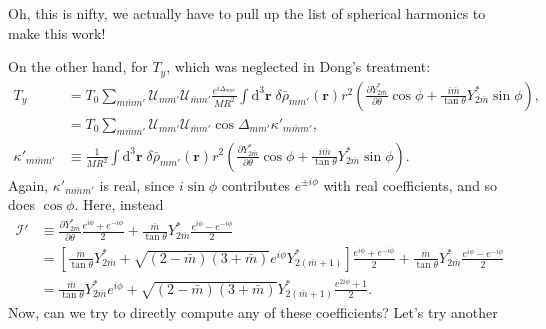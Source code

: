 \documentclass[12pt]{article}
\newcommand*{\pd}[2]{\frac{\partial#1}{\partial#2}}
\newcommand*{\bm}[1]{\boldsymbol{\mathbf{#1}}}
\newcommand*{\p}[1]{\left(#1\right)}
\newcommand*{\s}[1]{\left[#1\right]}
\begin{document}
Oh, this is nifty, we actually have to pull up the list of spherical harmonics
to make this work!

On the other hand, for $T_{y}$, which was neglected in Dong's treatment:
\begin{align}
    T_y
        &=
            T_0
            \sum\limits_{m\bar{m}m'}
            \mathcal{U}_{mm'}
            \mathcal{U}_{\bar{m}m'}
            \frac{e^{i\Delta_{mm'}}}{MR^2}
            \int\limits\mathrm{d}^3\bm{r}\;
                \delta\bar{\rho}_{mm'}\p{\bm{r}}
                r^2
                \p{
                    \pd{Y^*_{2\bar{m}}}{\theta}\cos\phi
                    + \frac{i\bar{m}}{\tan \theta}
                        Y^*_{2\bar{m}}\sin\phi
                },\\
        &=
            T_0
            \sum\limits_{m\bar{m}m'}
            \mathcal{U}_{mm'}
            \mathcal{U}_{\bar{m}m'}
            \cos \Delta_{mm'}
            \kappa'_{m\bar{m}m'},\\
    \kappa'_{m\bar{m}m'}
        &\equiv
            \frac{1}{MR^2}
            \int\limits\mathrm{d}^3\bm{r}\;
                \delta\bar{\rho}_{mm'}\p{\bm{r}}
                r^2
                \p{
                    \pd{Y^*_{2\bar{m}}}{\theta}\cos\phi
                    + \frac{i\bar{m}}{\tan \theta}
                        Y^*_{2\bar{m}}\sin\phi
                }.
\end{align}
Again, $\kappa'_{m\bar{m}m'}$ is real, since $i\sin\phi$ contributes $e^{\pm
i\phi}$ with real coefficients, and so does $\cos\phi$. Here, instead
\begin{align}
    \mathcal{I}'
        &\equiv
            \pd{Y_{2\bar{m}}^*}{\theta}
                    \frac{e^{i\phi} + e^{-i\phi}}{2}
                + \frac{\bar{m}}{\tan\theta}Y_{2\bar{m}}^*
                    \frac{e^{i\phi} - e^{-i\phi}}{2}\nonumber\\
        &=
            \s{\frac{\bar{m}}{\tan\theta} Y_{2\bar{m}}^*
                + \sqrt{(2-\bar{m})(3+\bar{m})}e^{i\phi}Y_{2(\bar{m} + 1)}^*}
                \frac{e^{i\phi} + e^{-i\phi}}{2}
            + \frac{\bar{m}}{\tan\theta}Y_{2\bar{m}}^*
                \frac{e^{i\phi} - e^{-i\phi}}{2}\nonumber\\
        &=
            \frac{\bar{m}}{\tan\theta}Y_{2\bar{m}}^*e^{i\phi}
                + \sqrt{(2-\bar{m})(3+\bar{m})}Y_{2(\bar{m} + 1)}^*
                \frac{e^{2i\phi} + 1}{2}.
\end{align}
Now, can we try to directly compute any of these coefficients? Let's try another
\end{document}
